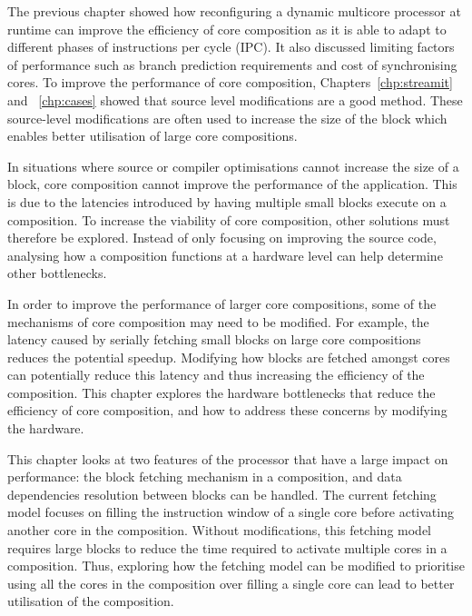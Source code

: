 The previous chapter showed how reconfiguring a dynamic multicore processor at runtime can improve the efficiency of core composition as it is able to adapt to different phases of instructions per cycle (IPC).
It also discussed limiting factors of performance such as branch prediction requirements and cost of synchronising cores.
To improve the performance of core composition, Chapters~\ref{chp:streamit} and ~\ref{chp:cases} showed that source level modifications are a good method.
These source-level modifications are often used to increase the size of the block which enables better utilisation of large core compositions.

In situations where source or compiler optimisations cannot increase the size of a block, core composition cannot improve the performance of the application.
This is due to the latencies introduced by having multiple small blocks execute on a composition.
To increase the viability of core composition, other solutions must therefore be explored.
Instead of only focusing on improving the source code, analysing how a composition functions at a hardware level can help determine other bottlenecks.

In order to improve the performance of larger core compositions, some of the mechanisms of core composition may need to be modified.%
For example, the latency caused by serially fetching small blocks on large core compositions reduces the potential speedup.
Modifying how blocks are fetched amongst cores can potentially reduce this latency and thus increasing the efficiency of the composition.
This chapter explores the hardware bottlenecks that reduce the efficiency of core composition, and how to address these concerns by modifying the hardware.

This chapter looks at two features of the processor that have a large impact on performance: the block fetching mechanism in a composition, and data dependencies resolution between blocks can be handled.
The current fetching model focuses on filling the instruction window of a single core before activating another core in the composition.
Without modifications, this fetching model requires large blocks to reduce the time required to activate multiple cores in a composition.
Thus, exploring how the fetching model can be modified to prioritise using all the cores in the composition over filling a single core can lead to better utilisation of the composition.

